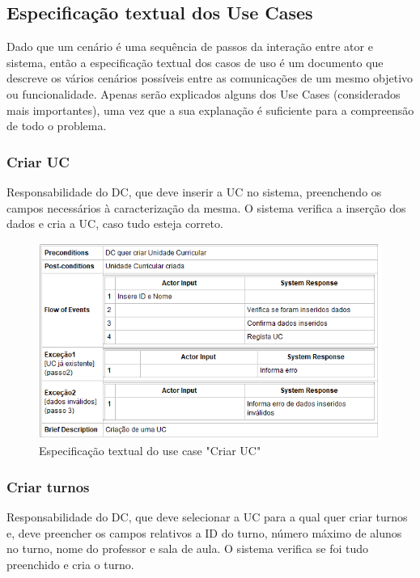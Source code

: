 \documentclass[a4paper]{article}
\begin{document}
\clearpage
\subsection{Especificação textual dos Use Cases}
\hspace{3mm}Dado que um cenário é uma sequência de passos da interação entre ator e sistema, então a especificação textual dos casos de uso é um documento que descreve os vários cenários possíveis entre as comunicações de um mesmo objetivo ou funcionalidade. Apenas serão explicados alguns dos Use Cases (considerados mais importantes), uma vez que a sua explanação é suficiente para a compreensão de todo o problema.

\subsubsection{Criar UC}
\hspace{3mm}Responsabilidade do DC, que deve inserir a UC no sistema, preenchendo os campos necessários à caracterização da mesma. O sistema verifica a inserção dos dados e cria a UC, caso tudo esteja correto.

\begin{figure}[H]
\centering
\includegraphics[width=14cm]{UCCriarUCADMIN}
\caption{Especificação textual do use case "Criar UC"}
\label{}
\end{figure}

\clearpage
\subsubsection{Criar turnos}
\hspace{3mm}Responsabilidade do DC, que deve selecionar a UC para a qual quer criar turnos e, deve preencher os campos relativos a ID do turno, número máximo de alunos no turno, nome do professor e sala de aula. O sistema verifica se foi tudo preenchido e cria o turno.
\end{document}
